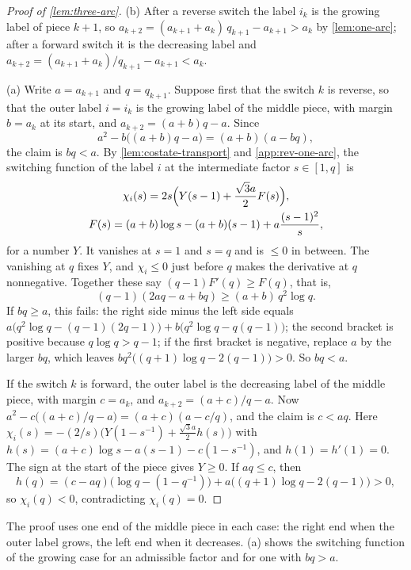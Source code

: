 \begin{proof}[Proof of \cref{lem:three-arc}]
(b) After a reverse switch the label $i_k$ is the growing label of piece $k+1$, so
$a_{k+2}=(a_{k+1}+a_k)\,q_{k+1}-a_{k+1}>a_k$ by \cref{lem:one-arc}; after a forward switch it is
the decreasing label and $a_{k+2}=(a_{k+1}+a_k)/q_{k+1}-a_{k+1}<a_k$.

(a) Write $a=a_{k+1}$ and $q=q_{k+1}$. Suppose first that the switch $k$ is reverse, so that the
outer label $i=i_k$ is the growing label of the middle piece, with margin $b=a_k$ at its start, and
$a_{k+2}=(a+b)q-a$. Since
\[
  a^2-b\bigl((a+b)q-a\bigr)=(a+b)(a-bq),
\]
the claim is $bq<a$. By \cref{lem:costate-transport} and \cref{app:rev-one-arc}, the switching
function of the label $i$ at the intermediate factor $s\in[1,q]$ is
\begin{gather*}
  \chi_i(s)=2s\Bigl(Y(s-1)+\frac{\sqrt3a}{2}F(s)\Bigr),\\
  F(s)=(a+b)\log s-(a+b)(s-1)+a\frac{(s-1)^2}{s},
\end{gather*}
for a number $Y$. It vanishes at $s=1$ and $s=q$ and is $\le0$ in between. The vanishing at $q$
fixes $Y$, and $\chi_i\le0$ just before $q$ makes the derivative at $q$ nonnegative. Together
these say $(q-1)F'(q)\ge F(q)$, that is,
\[
  (q-1)(2aq-a+bq)\ge(a+b)\,q^2\log q.
\]
If $bq\ge a$, this fails: the right side minus the left side equals
$a\bigl(q^2\log q-(q-1)(2q-1)\bigr)+b\bigl(q^2\log q-q(q-1)\bigr)$; the second bracket is
positive because $q\log q>q-1$; if the first bracket is negative, replace $a$ by the larger
$bq$, which leaves $bq^2\bigl((q+1)\log q-2(q-1)\bigr)>0$. So $bq<a$.

If the switch $k$ is forward, the outer label is the decreasing label of the middle piece, with
margin $c=a_k$, and $a_{k+2}=(a+c)/q-a$. Now $a^2-c\bigl((a+c)/q-a\bigr)=(a+c)(a-c/q)$, and the
claim is $c<aq$. Here $\chi_i(s)=-(2/s)\bigl(Y(1-s^{-1})+\frac{\sqrt3a}{2}h(s)\bigr)$ with
$h(s)=(a+c)\log s-a(s-1)-c(1-s^{-1})$, and $h(1)=h'(1)=0$. The sign at the start of the piece
gives $Y\ge0$. If $aq\le c$, then
\[
  h(q)=(c-aq)\bigl(\log q-(1-q^{-1})\bigr)+a\bigl((q+1)\log q-2(q-1)\bigr)>0,
\]
so $\chi_i(q)<0$, contradicting $\chi_i(q)=0$.
\end{proof}

The proof uses one end of the middle piece in each case: the right end when the outer label grows,
the left end when it decreases. (a) shows the switching function of
the growing case for an admissible factor and for one with $bq>a$.

